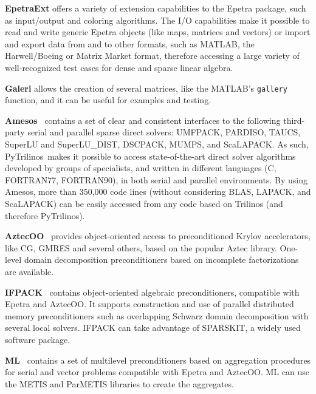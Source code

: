 \documentclass{llncs}
\newcommand{\PyTrilinos}{{\sc PyTrilinos}}
\begin{document}
\noindent
{\bf EpetraExt} offers a variety of extension capabilities to
  the Epetra package, such as input/output and coloring algorithms.
  The I/O capabilities make it possible to read and write generic
  Epetra objects (like maps, matrices and vectors) or import and
  export data from and to other formats, such as MATLAB, the
  Harwell/Boeing or Matrix Market format, therefore
  accessing a large variety of well-recognized test cases for dense
  and sparse linear algebra.

\smallskip

\noindent
{\bf Galeri} allows the creation of several matrices, like the
  MATLAB's {\tt gallery} function, and it can be useful for examples
  and testing. 

\smallskip

\noindent
{\bf Amesos}~\cite{Amesos-Reference-Guide} contains a set of clear and consistent interfaces
  to the following third-party serial and parallel sparse direct
  solvers: UMFPACK,
  PARDISO, TAUCS, SuperLU
  and SuperLU\_DIST,
  DSCPACK, MUMPS, and
  ScaLAPACK.  As such,
  \PyTrilinos\ makes it possible to access state-of-the-art direct
  solver algorithms developed by groups of specialists, and written in
  different languages (C, FORTRAN77, FORTRAN90), in both serial and
  parallel environments.  By using Amesos, more than 350,000 code
  lines (without considering BLAS, LAPACK, and ScaLAPACK) can be
  easily accessed from any code based on Trilinos (and therefore
  \PyTrilinos).

\smallskip

\noindent
{\bf AztecOO}~\cite{Aztec} provides object-oriented access to
preconditioned Krylov accelerators, like CG, GMRES and several others, based
on the popular Aztec library.  One-level domain decomposition preconditioners
based on incomplete factorizations are available.

\smallskip

\noindent
{\bf IFPACK}~\cite{ifpack-guide} contains object-oriented algebraic preconditioners,
  compatible with Epetra and AztecOO.  It supports construction and
  use of parallel distributed memory preconditioners such as
  overlapping Schwarz domain decomposition with several local solvers.
  IFPACK can take advantage of SPARSKIT, a widely used
  software package.

\smallskip

\noindent
{\bf ML}~\cite{ml-guide} contains a set of multilevel preconditioners based on
  aggregation procedures for serial and vector problems compatible
  with Epetra and AztecOO.  ML can use the METIS and
  ParMETIS libraries to create the aggregates.  
\end{document}
